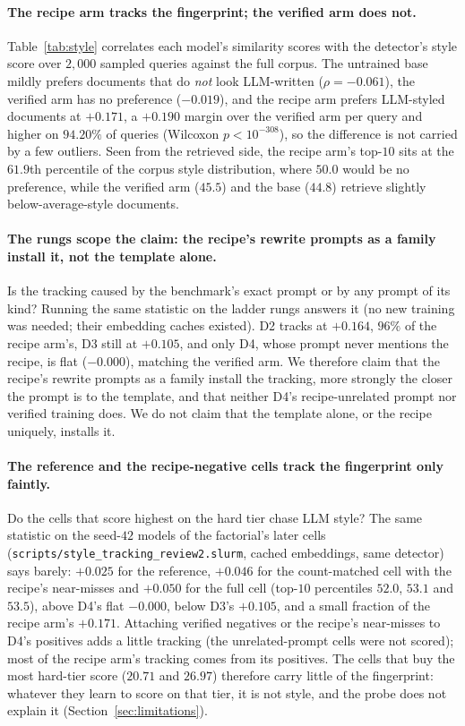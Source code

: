 \paragraph{The recipe arm tracks the fingerprint; the verified arm does not.}Table~\ref{tab:style} correlates each model's similarity scores with the detector's style score over $2{,}000$ sampled queries against the full corpus. The untrained base mildly prefers documents that do \emph{not} look LLM-written ($\rho = -0.061$), the verified arm has no preference ($-0.019$), and the recipe arm prefers LLM-styled documents at $+0.171$, a $+0.190$ margin over the verified arm per query and higher on $94.20\%$ of queries (Wilcoxon $p < 10^{-308}$), so the difference is not carried by a few outliers. Seen from the retrieved side, the recipe arm's top-$10$ sits at the $61.9$th percentile of the corpus style distribution, where $50.0$ would be no preference, while the verified arm ($45.5$) and the base ($44.8$) retrieve slightly below-average-style documents.

\paragraph{The rungs scope the claim: the recipe's rewrite prompts as a family install it, not the template alone.}Is the tracking caused by the benchmark's exact prompt or by any prompt of its kind? Running the same statistic on the ladder rungs answers it (no new training was needed; their embedding caches existed). D2 tracks at $+0.164$, $96\%$ of the recipe arm's, D3 still at $+0.105$, and only D4, whose prompt never mentions the recipe, is flat ($-0.000$), matching the verified arm. We therefore claim that the recipe's rewrite prompts as a family install the tracking, more strongly the closer the prompt is to the template, and that neither D4's recipe-unrelated prompt nor verified training does. We do not claim that the template alone, or the recipe uniquely, installs it.

\paragraph{The reference and the recipe-negative cells track the fingerprint only faintly.}
Do the cells that score highest on the hard tier chase LLM style? The same statistic on the seed-$42$ models of the factorial's later cells (\texttt{scripts/style\_tracking\_review2.slurm}, cached embeddings, same detector) says barely: $+0.025$ for the reference, $+0.046$ for the count-matched cell with the recipe's near-misses and $+0.050$ for the full cell (top-$10$ percentiles $52.0$, $53.1$ and $53.5$), above D4's flat $-0.000$, below D3's $+0.105$, and a small fraction of the recipe arm's $+0.171$. Attaching verified negatives or the recipe's near-misses to D4's positives adds a little tracking (the unrelated-prompt cells were not scored); most of the recipe arm's tracking comes from its positives. The cells that buy the most hard-tier score ($20.71$ and $26.97$) therefore carry little of the fingerprint: whatever they learn to score on that tier, it is not style, and the probe does not explain it (Section~\ref{sec:limitations}).

